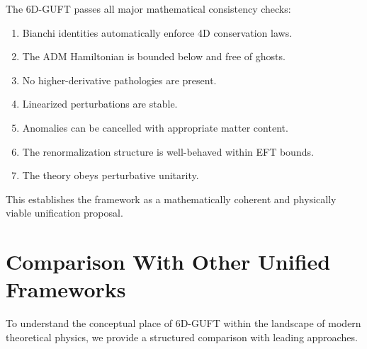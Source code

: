 \documentclass[12pt]{article}
\begin{document}
The 6D-GUFT passes all major mathematical consistency checks:
\begin{enumerate}
\item Bianchi identities automatically enforce 4D conservation laws.
\item The ADM Hamiltonian is bounded below and free of ghosts.
\item No higher-derivative pathologies are present.
\item Linearized perturbations are stable.
\item Anomalies can be cancelled with appropriate matter content.
\item The renormalization structure is well-behaved within EFT bounds.
\item The theory obeys perturbative unitarity.
\end{enumerate}

This establishes the framework as a mathematically coherent and physically
viable unification proposal.

\newpage


\newpage
\section{Comparison With Other Unified Frameworks}

To understand the conceptual place of 6D-GUFT within the landscape of modern
theoretical physics, we provide a structured comparison with leading approaches.
\end{document}

